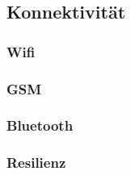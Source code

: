\subsection{Konnektivität}
\label{subsec:konnektivitat}

\subsubsection{Wifi}

\subsubsection{GSM}

\subsubsection{Bluetooth}

\subsubsection{Resilienz}
